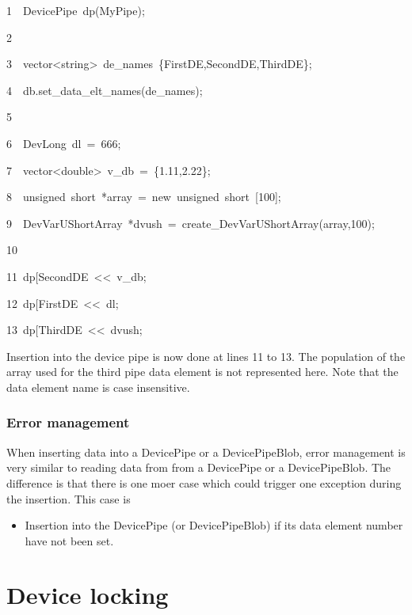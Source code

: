 
\begin{lyxcode}
1~~DevicePipe~dp(\textquotedbl{}MyPipe\textquotedbl{});

2~

3~~vector<string>~de\_names~\{\textquotedbl{}FirstDE\textquotedbl{},\textquotedbl{}SecondDE\textquotedbl{},\textquotedbl{}ThirdDE\textquotedbl{}\};

4~~db.set\_data\_elt\_names(de\_names);

5

6~~DevLong~dl~=~666;~~

7~~vector<double>~v\_db~=~\{1.11,2.22\};

8~~unsigned~short~{*}array~=~new~unsigned~short~{[}100{]};

9~~DevVarUShortArray~{*}dvush~=~create\_DevVarUShortArray(array,100);

10

11~dp{[}\textquotedbl{}SecondDE\textquotedbl{}{]}~<\textcompwordmark{}<~v\_db;

12~dp{[}\textquotedbl{}FirstDE\textquotedbl{}{]}~<\textcompwordmark{}<~dl;

13~dp{[}\textquotedbl{}ThirdDE\textquotedbl{}{]}~<\textcompwordmark{}<~dvush;
\end{lyxcode}


Insertion into the device pipe is now done at lines 11 to 13. The
population of the array used for the third pipe data element is not
represented here. Note that the data element name is case insensitive.


\subsubsection{Error management}

When inserting data into a DevicePipe or a DevicePipeBlob, error management
is very similar to reading data from from a DevicePipe or a DevicePipeBlob.
The difference is that there is one moer case which could trigger
one exception during the insertion. This case is
\begin{itemize}
\item Insertion into the DevicePipe (or DevicePipeBlob) if its data element
number have not been set.
\end{itemize}

\section{Device locking}

